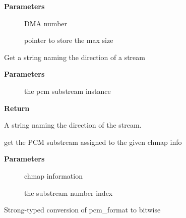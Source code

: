 \documentclass[a4paper,8pt,english]{sphinxmanual}
\begin{document}
\textbf{Parameters}
\begin{description}
\item[{}] \leavevmode
DMA number

\item[{}] \leavevmode
pointer to store the max size

\end{description}

\begin{fulllineitems}
\label{sound/kernel-api/alsa-driver-api:c.snd_pcm_stream_str}
Get a string naming the direction of a stream

\end{fulllineitems}


\textbf{Parameters}
\begin{description}
\item[{}] \leavevmode
the pcm substream instance

\end{description}

\textbf{Return}

A string naming the direction of the stream.

\begin{fulllineitems}
\label{sound/kernel-api/alsa-driver-api:c.snd_pcm_chmap_substream}
get the PCM substream assigned to the given chmap info

\end{fulllineitems}


\textbf{Parameters}
\begin{description}
\item[{}] \leavevmode
chmap information

\item[{}] \leavevmode
the substream number index

\end{description}

\begin{fulllineitems}
\label{sound/kernel-api/alsa-driver-api:c.pcm_format_to_bits}
Strong-typed conversion of pcm\_format to bitwise

\end{fulllineitems}
\end{document}
